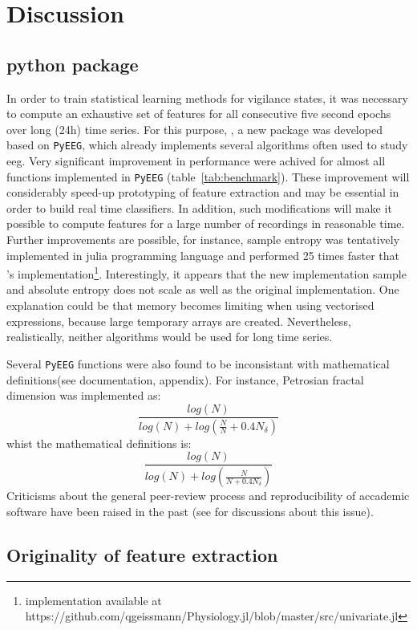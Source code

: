 \section{Discussion} \label{discussion}

\subsection{python package}
 
In order to train statistical learning methods for vigilance states, 
it was necessary to compute an exhaustive set of features for all consecutive five second epochs
over long (24h) time series.
For this purpose, \pr{}, a new \py{} package was developed based on
\texttt{PyEEG}\citationneeded{},  which already implements several algorithms often used to study \gls{eeg}.
Very significant improvement in performance were achived for almost all functions implemented in \texttt{PyEEG}
(table~\ref{tab:benchmark}). These improvement will considerably speed-up prototyping of feature extraction
and may be essential in order to build real time classifiers. 
In addition, such modifications will make it possible to compute features for a large number
of recordings in reasonable time.
Further improvements are possible, for instance, 
sample entropy was tentatively implemented in julia programming language and performed 25 times faster that
\pr{}'s implementation\footnote{implementation available at 
https://github.com/qgeissmann/Physiology.jl/blob/master/src/univariate.jl}.
Interestingly, it appears that the new implementation sample and 
absolute entropy does not scale as well as the original implementation.
One explanation could be that memory becomes limiting when using vectorised expressions, because large temporary arrays are created.
Nevertheless, realistically, neither algorithms would be used for long time series.

Several \texttt{PyEEG} functions were also found to be inconsistant with mathematical
definitions(see \pr{} documentation, appendix).
For instance, Petrosian fractal dimension \citationneeded{} was implemented as:
\[
\frac{log(N)}{log(N) + log(\frac{N}{N}+0.4N_{\delta})}
\]
whist the mathematical definitions is:
\[
\frac{log(N)}{log(N) + log(\frac{N}{N+0.4N_{\delta}})}
\]
Criticisms about the general peer-review process and reproducibility of accademic software 
have been raised in the past (see  for discussions about this issue).

\subsection{Originality of feature extraction}

